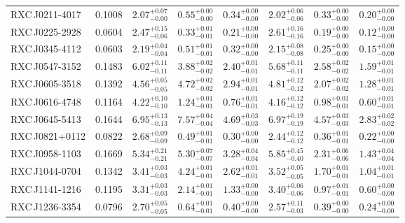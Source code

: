 \begin{table*}
\begin{tabular}{l l l r r l r r}
    RXC\,J0211-4017 & 0.1008 & $2.07_{-0.00}^{+0.07}$ & $ 0.55_{-0.00}^{+0.00}$ & $ 0.34_{-0.00}^{+0.00}$ & $2.02_{-0.06}^{+0.06}$ & $ 0.33_{-0.00}^{+0.00}$ & $ 0.20_{-0.00}^{+0.00}$ \\
    RXC\,J0225-2928 & 0.0604 & $2.47_{-0.06}^{+0.15}$ & $ 0.33_{-0.01}^{+0.01}$ & $ 0.21_{-0.00}^{+0.00}$ & $2.61_{-0.16}^{+0.16}$ & $ 0.19_{-0.00}^{+0.00}$ & $ 0.12_{-0.00}^{+0.00}$ \\
    RXC\,J0345-4112 & 0.0603 & $2.19_{-0.04}^{+0.04}$ & $ 0.51_{-0.01}^{+0.01}$ & $ 0.32_{-0.00}^{+0.00}$ & $2.15_{-0.08}^{+0.08}$ & $ 0.25_{-0.00}^{+0.00}$ & $ 0.15_{-0.00}^{+0.00}$ \\
    RXC\,J0547-3152 & 0.1483 & $6.02_{-0.11}^{+0.11}$ & $ 3.88_{-0.02}^{+0.02}$ & $ 2.40_{-0.01}^{+0.01}$ & $5.68_{-0.11}^{+0.11}$ & $ 2.58_{-0.02}^{+0.02}$ & $ 1.59_{-0.01}^{+0.01}$ \\
    RXC\,J0605-3518 & 0.1392 & $4.56_{-0.05}^{+0.05}$ & $ 4.72_{-0.02}^{+0.02}$ & $ 2.94_{-0.01}^{+0.01}$ & $4.81_{-0.12}^{+0.12}$ & $ 2.07_{-0.02}^{+0.02}$ & $ 1.28_{-0.01}^{+0.01}$ \\
    RXC\,J0616-4748 & 0.1164 & $4.22_{-0.10}^{+0.10}$ & $ 1.24_{-0.01}^{+0.01}$ & $ 0.76_{-0.01}^{+0.01}$ & $4.16_{-0.12}^{+0.12}$ & $ 0.98_{-0.01}^{+0.01}$ & $ 0.60_{-0.01}^{+0.01}$ \\
    RXC\,J0645-5413 & 0.1644 & $6.95_{-0.13}^{+0.13}$ & $ 7.57_{-0.04}^{+0.04}$ & $ 4.69_{-0.03}^{+0.03}$ & $6.97_{-0.19}^{+0.19}$ & $ 4.57_{-0.03}^{+0.03}$ & $ 2.83_{-0.02}^{+0.02}$ \\
    RXC\,J0821+0112 & 0.0822 & $2.68_{-0.09}^{+0.09}$ & $ 0.49_{-0.01}^{+0.01}$ & $ 0.30_{-0.00}^{+0.00}$ & $2.44_{-0.12}^{+0.12}$ & $ 0.36_{-0.01}^{+0.01}$ & $ 0.22_{-0.00}^{+0.00}$ \\
    RXC\,J0958-1103 & 0.1669 & $5.34_{-0.21}^{+0.21}$ & $ 5.30_{-0.07}^{+0.07}$ & $ 3.28_{-0.04}^{+0.04}$ & $5.85_{-0.40}^{+0.45}$ & $ 2.31_{-0.06}^{+0.06}$ & $ 1.43_{-0.04}^{+0.04}$ \\
    RXC\,J1044-0704 & 0.1342 & $3.41_{-0.03}^{+0.03}$ & $ 4.24_{-0.01}^{+0.01}$ & $ 2.62_{-0.01}^{+0.01}$ & $3.52_{-0.05}^{+0.05}$ & $ 1.70_{-0.01}^{+0.01}$ & $ 1.04_{-0.01}^{+0.01}$ \\
    RXC\,J1141-1216 & 0.1195 & $3.31_{-0.03}^{+0.03}$ & $ 2.14_{-0.01}^{+0.01}$ & $ 1.33_{-0.00}^{+0.00}$ & $3.40_{-0.06}^{+0.06}$ & $ 0.97_{-0.01}^{+0.01}$ & $ 0.60_{-0.00}^{+0.00}$ \\
    RXC\,J1236-3354 & 0.0796 & $2.70_{-0.05}^{+0.05}$ & $ 0.64_{-0.01}^{+0.01}$ & $ 0.40_{-0.00}^{+0.00}$ & $2.57_{-0.03}^{+0.11}$ & $ 0.39_{-0.00}^{+0.00}$ & $ 0.24_{-0.00}^{+0.00}$ \\

\end{tabular}
\end{table*}
